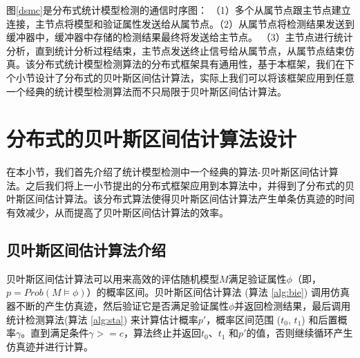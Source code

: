 \begin{figure}[htbp]
\end{figure}
图\ref{dsmc}是分布式统计模型检测的通信时序图： （1）多个从属节点跟主节点建立连接，主节点将模型和验证属性发送给从属节点。（2）从属节点将检测结果发送到缓冲器中，缓冲器中存储的检测结果最终将发送给主节点。 （3）主节点进行统计分析，直到统计分析过程结束，主节点发送终止信号给从属节点，从属节点结束仿真。该分布式统计模型检测算法的分布式框架具有通用性，基于本框架，我们在下个小节设计了分布式的贝叶斯区间估计算法，实际上我们可以将该框架应用到任意一个经典的统计模型检测算法而不只局限于贝叶斯区间估计算法。
\section{分布式的贝叶斯区间估计算法设计}
\label{sec:dbie}
在本小节，我们首先介绍了统计模型检测中一个经典的算法-贝叶斯区间估计算法。之后我们将上一小节提出的分布式框架应用到本算法中，并得到了分布式的贝叶斯区间估计算法。该分布式算法使得贝叶斯区间估计算法产生单条仿真迹的时间有效减少，从而提高了贝叶斯区间估计算法的效率。
\subsection{贝叶斯区间估计算法介绍}
贝叶斯区间估计算法可以用来高效的评估随机模型$M$满足验证属性$\phi$（即，$p=Prob(M\models\phi)$）的概率区间。贝叶斯区间估计算法 (算法 \ref{alg:bie}) 调用仿真器不断的产生仿真迹，然后验证它是否满足验证属性$\phi$并返回检测结果，最后调用统计检测算法(算法 \ref{alg:sta}) 来计算估计概率$p'$，概率区间范围 ($t_0$, $t_1$) 和后置概率$\gamma$。直到满足条件$\gamma >= c$，算法终止并返回$t_0$、$t_1$ 和$p'$的值，否则继续循环产生仿真迹并进行计算。

